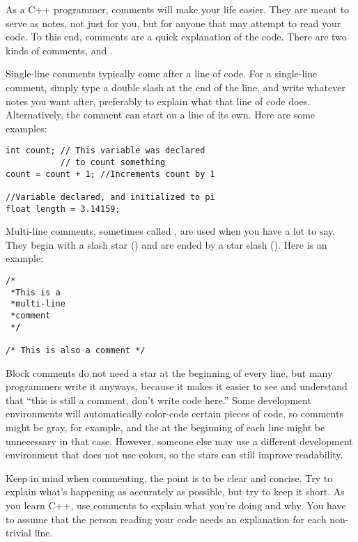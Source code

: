 
As a C++ programmer, comments will make your life easier. 
They are meant to serve as notes, not just for you, but for anyone that may attempt to read your code. 
To this end, comments are a quick explanation of the code. 
There are two kinds of comments,  and .

Single-line comments typically come after a line of code. 
For a single-line comment, simply type a double slash \Code{//} at the end of the line, and write whatever notes you want after, preferably to explain what that line of code does.
Alternatively, the comment can start on a line of its own.
Here are some examples:

\noindent\begin{minipage}{\linewidth}\begin{lstlisting}
int count; // This variable was declared 
           // to count something
count = count + 1; //Increments count by 1

//Variable declared, and initialized to pi
float length = 3.14159; 
\end{lstlisting}\end{minipage}

Multi-line comments, sometimes called , are used when you have a lot to say. 
They begin with a slash star (\Code{/*}) and are ended by a star slash (\Code{*/}). 
Here is an example:

\noindent\begin{minipage}{\linewidth}\begin{lstlisting}
/* 
 *This is a
 *multi-line 
 *comment
 */
 
/* This is also a comment */ 
\end{lstlisting}\end{minipage}

Block comments do not need a star at the beginning of every line, but many programmers write it anyways, because it makes it easier to see and understand that ``this is still a comment, don't write code here.'' 
Some development environments will automatically color-code certain pieces of code, so comments might be gray, for example, and the \Code{*} at the beginning of each line might be unnecessary in that case. 
However, someone else may use a different development environment that does not use colors, so the stars can still improve readability.

Keep in mind when commenting, the point is to be clear and concise. 
Try to explain what's happening as accurately as possible, but try to keep it short. 
As you learn C++, use comments to explain what you're doing and why. 
You have to assume that the person reading your code needs an explanation for each non-trivial line. 

